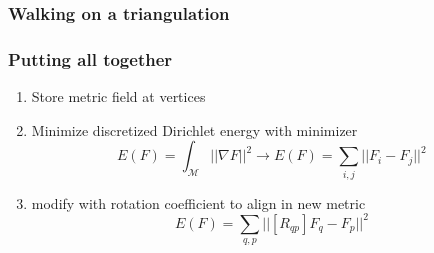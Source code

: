 \documentclass[
	11pt, %
	aspectratio=169, %
]{beamer}
\begin{document}
\begin{frame}
	\frametitle{Walking on a triangulation}
	\begin{figure}[htb]
		\centering
		\def\svgwidth{0.8\linewidth}
		
		\label{fig:walking}
	\end{figure}
\end{frame}

\begin{frame}
	\frametitle{Putting all together}
	\begin{enumerate}
		\item Store metric field at vertices
		\item Minimize discretized Dirichlet energy with minimizer
		\begin{equation}
			E(F)=\int_{\mathcal{M}}||\nabla F||^2 \longrightarrow E(F)= \sum_{i,j} ||F_i-F_j||^2
		\end{equation}
		\item modify with rotation coefficient to align in new metric
		\begin{equation}
			E(F)= \sum_{q,p} ||[R_{qp}]F_q-F_p||^2
		\end{equation}
	\end{enumerate}
\end{frame}
\end{document}
